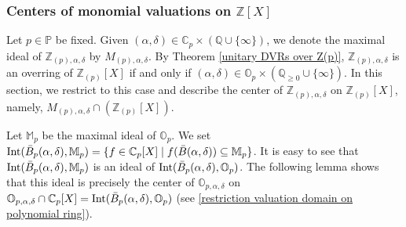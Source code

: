 \documentclass[10pt]{article}
\numberwithin{equation}{section}
\theoremstyle{definition}
\theoremstyle{definition}
\newcommand{\Q}{\mathbb{Q}}
\newcommand{\Z}{\mathbb{Z}}
\newcommand{\C}{\mathbb{C}}
\renewcommand{\O}{\mathbb{O}}
\newcommand{\PP}{\mathbb{P}}
\newcommand{\Int}{\textnormal{Int}}
\newcommand\rc { \color{red}}
\begin{document}






\subsubsection{Centers of monomial valuations on $\Z[X]$}\label{centers}
Let $p\in\PP$ be fixed. Given $(\alpha,\delta)\in\C_p \times(\Q\cup\{\infty\})$, we denote the maximal ideal of $\Z_{(p),\alpha,\delta}$ by $M_{(p),\alpha,\delta}$. By Theorem \ref{unitary DVRs over Z(p)}, $\Z_{(p),\alpha,\delta}$ is an overring of $\Z_{(p)}[X]$ if and only if $(\alpha,\delta)\in\O_p\times(\Q_{\geq0}\cup\{\infty\})$. In this section, we restrict to this case and describe the center of $\Z_{(p),\alpha,\delta}$ on $\Z_{(p)}[X]$, namely, $M_{(p),\alpha,\delta}\cap (\Z_{(p)}[X])$.

Let $\mathbb M_p$ be the maximal ideal of $\O_p$. We set $\Int(\bar B_p(\alpha,\delta),\mathbb M_p)=\{f\in\C_p[X]\mid f(\bar B(\alpha,\delta))\subseteq\mathbb M_p\}$. It is easy to see that $\Int(\bar B_p(\alpha,\delta),\mathbb M_p)$ is an ideal of $\Int(\bar B_p(\alpha,\delta),\O_p)$. The following lemma shows that this ideal is precisely the center of $\O_{p,\alpha,\delta}$ on $\O_{p,\alpha,\delta}\cap\C_p[X]=\Int(\bar B_p(\alpha,\delta),\O_p)$ (see \eqref{restriction valuation domain on polynomial ring}).
\end{document}
